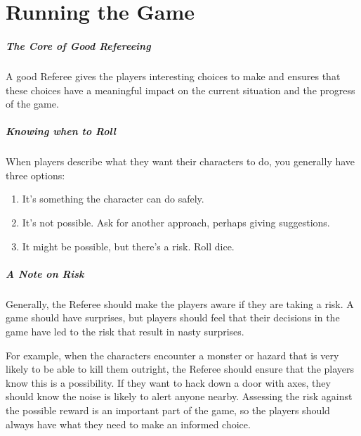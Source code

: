 \documentclass[itdr]{subfiles}
\begin{document}

\chapter{Running the Game}
\label{ch:running_the_game}

\paragraph{The Core of Good Refereeing}
A good Referee gives the players interesting choices to make and ensures that these choices have a meaningful impact on the current situation and the progress of the game.

\vfill

\paragraph{Knowing when to Roll}
When players describe what they want their characters to do, you generally have three options:
\begin{enumerate}
	\item It's something the character can do safely.
	\item It's not possible. Ask for another approach, \mbox{perhaps} giving suggestions.
	\item It might be possible, but there's a risk. Roll dice.
\end{enumerate}

\vfill

\paragraph{A Note on Risk}
Generally, the Referee should make the players aware if they are taking a risk. A game should have surprises, but players should feel that their decisions in the game have led to the risk that result in nasty surprises.

For example, when the characters encounter a monster or hazard that is very likely to be able to kill them outright, the Referee should ensure that the players know this is a possibility. If they want to hack down a door with axes, they should know the noise is likely to alert anyone nearby. Assessing the risk against the possible reward is an important part of the game, so the players should always have what they need to make an informed choice.

\vfill
\end{document}
